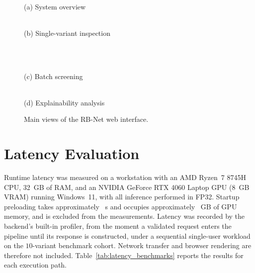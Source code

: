 \begin{figure}[htbp]
    \centering
    \begin{minipage}{0.48\textwidth}\centering
        \\[2pt]
        \small (a) System overview
    \end{minipage}\hfill
    \begin{minipage}{0.48\textwidth}\centering
        \\[2pt]
        \small (b) Single-variant inspection
    \end{minipage}\\[8pt]
    \begin{minipage}{0.48\textwidth}\centering
        \\[2pt]
        \small (c) Batch screening
    \end{minipage}\hfill
    \begin{minipage}{0.48\textwidth}\centering
        \\[2pt]
        \small (d) Explainability analysis
    \end{minipage}
    \caption{Main views of the RB-Net web interface.}
    \label{fig:web_interface}
\end{figure}

\section{Latency Evaluation}
\label{sec:latency}

Runtime latency was measured on a workstation with an AMD Ryzen~7 8745H CPU, 32~GB of RAM, and an NVIDIA GeForce RTX 4060 Laptop GPU (8~GB VRAM) running Windows~11, with all inference performed in FP32. Startup preloading takes approximately \tbd{}~s and occupies approximately \tbd{}~GB of GPU memory, and is excluded from the measurements. %
Latency was recorded by the backend's built-in profiler, from the moment a validated request enters the pipeline until its response is constructed, under a sequential single-user workload on the $10$-variant benchmark cohort. Network transfer and browser rendering are therefore not included. Table~\ref{tab:latency_benchmarks} reports the results for each execution path.

